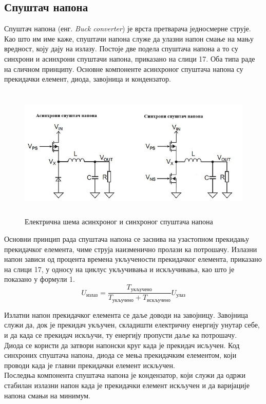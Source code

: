 \documentclass{article}
\begin{document}
\subsection{Спуштач напона}
Спуштач напона (енг. \textit{Buck converter}) је врста претварача једносмерне струје. Као што им име каже, спуштачи напона служе да улазни напон смање на мању вредност, коју дају на излазу. Постоје две подела спуштача напона а то су синхрони и асинхрони спуштачи напона, приказано на слици 17. Оба типа раде на сличном принципу. Основне компоненте асинхроног спуштача напона су прекидачки елемент, диода, завојница и кондензатор. 
\begin{figure}[H]
\centering
\includegraphics[height=2.5in]{Images/buck.jpg }
\caption{Електрична шема асинхроног и синхроног спуштача напона}
\label{fig:figure17}
\end{figure}
Основни принцип рада спуштача напона се заснива на узастопном прекидању прекидачког елемента, чиме струја наизменично пролази ка потрошачу. Излазни напон зависи од процента времена укључености прекидачког елемента, приказано на слици 17, у односу на циклус укључивања и искључивања, као што је показано у формули 1.\\
\begin{equation}
    U_{\text{излаз}} = \frac{T_{\text{укључено}}}{T_{\text{укључено}} + T_{\text{искључено}}} U_{\text{улаз}}
\end{equation}

Излатни напон прекидачког елемента се даље доводи на завојницу. Завојница служи да, док је прекидач укључен, складишти електричну енергију унутар себе, и да када се прекидач искључи, ту енергију пропусти даље ка потрошачу. \\
Диода се користи да затвори напонски круг када је прекидач исључен. Код синхроних спуштача напона, диода се мења прекидачким елементом, који проводи када је главни прекидачки елемент искључен.\\
Последња компонента спуштача напона је кондензатор, који служи да одржи стабилан излазни напон када је прекидачки елемент искључен и да варијације напона смањи на минимум.
\end{document}
